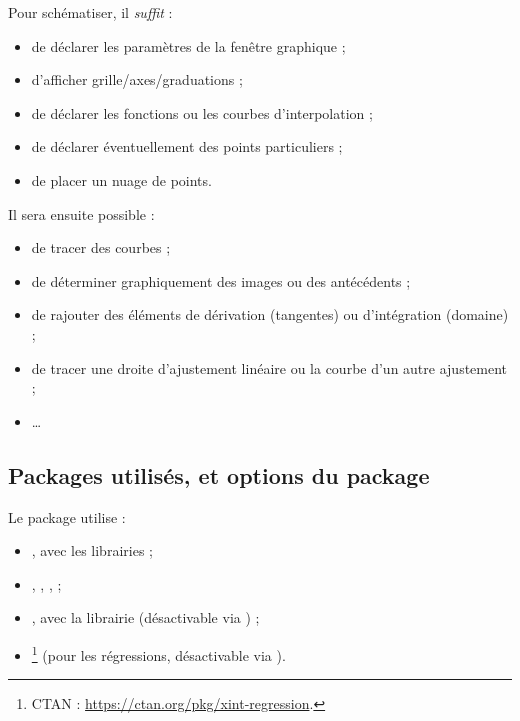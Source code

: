 \documentclass[11pt,a4paper]{ltxdoc}
\begin{document}
Pour schématiser, il \textit{suffit} :

\smallskip

\begin{itemize}
	\item de déclarer les paramètres de la fenêtre graphique ;
	\item d'afficher grille/axes/graduations ;
	\item de déclarer les fonctions ou les courbes d'interpolation ;
	\item de déclarer éventuellement des points particuliers ;
	\item de placer un nuage de points.
\end{itemize}

\smallskip

Il sera ensuite possible :

\begin{itemize}
	\item de tracer des courbes ;
	\item de déterminer graphiquement des images ou des antécédents ;
	\item de rajouter des éléments de dérivation (tangentes) ou d'intégration (domaine) ;
	\item de tracer une droite d'ajustement linéaire ou la courbe d'un autre ajustement ;
	\item \dots
\end{itemize}

\subsection{Packages utilisés, et options du package}

Le package utilise :

\smallskip

\begin{itemize}
	\item {}, avec les librairies  ;
	\item {}, , ,  ;
	\item {}, avec la librairie  (désactivable via \MontreCode{[nonpgfplots]}) ;
	\item {}\footnote{CTAN : \url{https://ctan.org/pkg/xint-regression}.} (pour les régressions, désactivable via \MontreCode{[nonxintreg]}).
\end{itemize}
\end{document}
